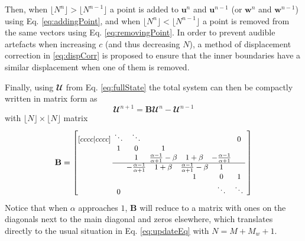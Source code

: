 Then, when $\lfloor N^n \rfloor > \lfloor N^{n-1} \rfloor$ a point is added to $\mathbf{u}^n$ and $\mathbf{u}^{n-1}$ (or $\mathbf{w}^n$ and $\mathbf{w}^{n-1}$) using Eq. \eqref{eq:addingPoint}, and when $\lfloor N^n \rfloor <\lfloor N^{n-1} \rfloor$ a point is removed from the same vectors using Eq. \eqref{eq:removingPoint}. In order to prevent audible artefacts when increasing $c$ (and thus decreasing $N$), a method of displacement correction in \eqref{eq:dispCorr} is proposed to ensure that the inner boundaries have a similar displacement when one of them is removed.

Finally, using $\mathbfcal{U}$ from Eq. \eqref{eq:fullState} the total system can then be compactly written in matrix form as
\begin{equation}\label{eq:totalSystem}
    \mathbfcal{U}^{n+1} = 
    \mathbf{B} 
    \mathbfcal{U}^n
    - \mathbfcal{U}^{n-1}
\end{equation}
with $\lfloor N\rfloor \times \lfloor N\rfloor$ matrix
\begin{equation}\label{eq:bMat}\small
    \mathbf{B} = 
    \begingroup %
    \setlength\arraycolsep{2pt}
    \begin{bmatrix}[cccc|cccc]
        & \ddots  &\ddots & & & & 0 & \\
          & 1 & 0 & 1 & & & & \\
         & & 1 & \frac{\alpha - 1}{\alpha + 1} - \beta  & 1 + \beta & -\frac{\alpha - 1}{\alpha + 1} & \\ \cline{2-7}
         & & -\frac{\alpha - 1}{\alpha + 1} & 1 + \beta & \frac{\alpha - 1}{\alpha + 1} - \beta  & 1 & & \\
            & & & &1 & 0 & 1  \\
            & 0 & &  &  &\ddots & \ddots &
       \end{bmatrix}
       \endgroup
\end{equation}
%
%
Notice that when $\alpha$ approaches $1$, $\mathbf{B}$ will reduce to a matrix with ones on the diagonals next to the main diagonal and zeros elsewhere, which translates directly to the usual situation in Eq. \eqref{eq:updateEq} with $N = M + M_w + 1$. 

